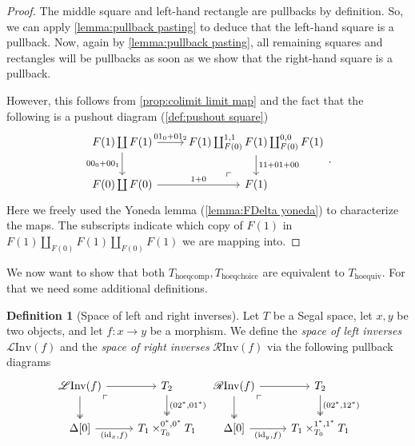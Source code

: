 \documentclass[11pt, a4paper]{amsart}
\newcommand{\id}{\mathrm{id}}
\newcommand{\hoequiv}{\mathrm{hoequiv}}
\newcommand{\hoeqchoice}{\mathrm{hoeqchoice}}
\newcommand{\hoeqcomp}{\mathrm{hoeqcomp}}
\newcommand{\LInv}{\mathscr{L}\mathrm{Inv}}
\newcommand{\RInv}{\mathscr{R}\mathrm{Inv}}
\theoremstyle{definition}
\newtheorem{definition}[equation]{Definition}
\theoremstyle{remark}
\numberwithin{equation}{section}
\begin{document}
\begin{proof}
 The middle square and left-hand rectangle are pullbacks by definition. So, we can apply \cref{lemma:pullback pasting} to deduce that the left-hand square is a pullback. Now, again by \cref{lemma:pullback pasting}, all remaining squares and rectangles will be pullbacks as soon as we show that the right-hand square is a pullback. 
 
 However, this follows from \cref{prop:colimit limit map} and the fact that the following is a pushout diagram (\cref{def:pushout square})
 \[
\begin{tikzcd}
 F(1) \coprod F(1) \arrow[r, "01_0 + 01_2"] \arrow[d, "00_0 + 00_1"'] & F(1) \coprod_{F(0)}^{1,1} F(1) \coprod_{F(0)}^{0,0} F(1)\arrow[d, "11 + 01 + 00"] \\
  F(0) \coprod F(0) \arrow[r, "1 + 0"] &  F(1) \arrow[ul, phantom, "\ulcorner", very near start]
\end{tikzcd}.
\]
Here we freely used the Yoneda lemma (\cref{lemma:FDelta yoneda}) to characterize the maps. The subscripts indicate which copy of $F(1)$ in $ F(1) \coprod_{F(0)} F(1) \coprod_{F(0)} F(1)$ we are mapping into.
\end{proof}

We now want to show that both $T_{\hoeqcomp}, T_{\hoeqchoice}$ are equivalent to $T_{\hoequiv}$. For that we need some additional definitions.

\begin{definition}[Space of left and right inverses] \label{def:linv rinv}
  Let $T$ be a Segal space, let $x,y$ be two objects, and let $f\colon x \to y$ be a morphism. We define the \emph{space of left inverses} $\LInv(f)$ and the \emph{space of right inverses} $\RInv(f)$ via the following pullback diagrams
\[
\begin{tikzcd}
\LInv(f) \arrow[r] \arrow[d, twoheadrightarrow] \arrow[dr, phantom, "\ulcorner", very near start] & T_2 \arrow[d, "{(02^*,01^*)}", twoheadrightarrow] \\
\Delta[0] \arrow[r, "{(\id_x , f)}"'] & T_1 \times^{0^*,0^*}_{T_0} T_1
\end{tikzcd}
\begin{tikzcd}
\RInv(f) \arrow[r] \arrow[d, twoheadrightarrow] \arrow[dr, phantom, "\ulcorner", very near start] & T_2 \arrow[d, "{(02^*,12^*)}", twoheadrightarrow] \\
\Delta[0] \arrow[r, "{(\id_y , f)}"'] & T_1 \times^{1^*,1^*}_{T_0} T_1
\end{tikzcd}
\]
\end{definition}
\end{document}
